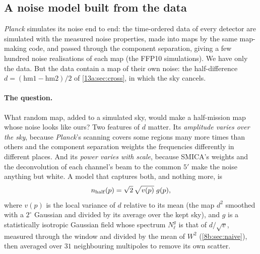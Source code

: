 \subsection{A noise model built from the data}
\label{13a:sec:noise}

\textit{Planck} simulates its noise end to end: the time-ordered data of every detector are simulated with the
measured noise properties, made into maps by the same map-making code, and passed through the component
separation, giving a few hundred noise realisations of each map (the FFP10 simulations). We have only the
data. But the data contain a map of their own noise: the half-difference
$d=(\text{hm1}-\text{hm2})/2$ of \cref{13a:sec:cross}, in which the sky cancels.

\paragraph{The question.} What random map, added to a simulated sky, would make a half-mission map whose noise
looks like ours? Two features of $d$ matter. Its \emph{amplitude varies over the sky}, because \textit{Planck}'s
scanning covers some regions many more times than others and the component separation weights the
frequencies differently in different places. And its \emph{power varies with scale}, because SMICA's weights
and the deconvolution of each channel's beam to the common $5'$ make the noise anything but white. A model
that captures both, and nothing more, is
\begin{equation}
  n_{\rm half}(p)=\sqrt2\,\sqrt{v(p)}\;g(p),
  \label{13a:eq:noise-model}
\end{equation}
where $v(p)$ is the local variance of $d$ relative to its mean (the map $d^2$ smoothed with a $2^\circ$ Gaussian and
divided by its average over the kept sky), and $g$ is a statistically isotropic Gaussian field whose spectrum
$N^g_\ell$ is that of $d/\sqrt v$, measured through the window and divided by the mean of $W^2$
(\cref{8b:sec:naive}), then averaged over $31$ neighbouring multipoles to remove its own scatter.

